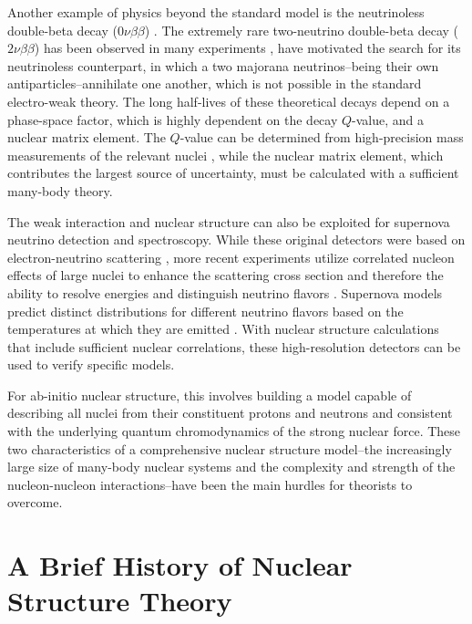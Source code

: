 \documentclass[../thesis.tex]{subfiles}
\begin{document}
Another example of physics beyond the standard model is the neutrinoless double-beta decay ($0\nu\beta\beta$) \cite{SUHONEN1998123,AVIGNONE2008481}. The extremely rare two-neutrino double-beta decay ($2\nu\beta\beta$) has been observed in many experiments \cite{ELLIOTT19872020,MILEY19903092}, have motivated the search for its neutrinoless counterpart, in which a two majorana neutrinos--being their own antiparticles--annihilate one another, which is not possible in the standard electro-weak theory. The long half-lives of these theoretical decays depend on a phase-space factor, which is highly dependent on the decay $Q$-value, and a nuclear matrix element. The $Q$-value can be determined from high-precision mass measurements of the relevant nuclei \cite{LINCOLN2013012501,GULYUZ2015055501,REDSHAW2012041306,BUSTABAD2013022501}, while the nuclear matrix element, which contributes the largest source of uncertainty, must be calculated with a sufficient many-body theory. 

The weak interaction and nuclear structure can also be exploited for supernova neutrino detection and spectroscopy. While these original detectors were based on electron-neutrino scattering \cite{HIRATA19871490,BIONTA19871494}, more recent experiments utilize correlated nucleon effects of large nuclei to enhance the scattering cross section and therefore the ability to resolve energies and distinguish neutrino flavors \cite{HARGROVE1996183,CLINE1994720,EWAN1992373,LANGANKE19962629}. Supernova models predict distinct distributions for different neutrino flavors based on the temperatures at which they are emitted \cite{KOLBE20032569,BENHAR2005053005}. With nuclear structure calculations that include sufficient nuclear correlations, these high-resolution detectors can be used to verify specific models.

For ab-initio nuclear structure, this involves building a model capable of describing all nuclei from their constituent protons and neutrons and consistent with the underlying quantum chromodynamics of the strong nuclear force. These two characteristics of a comprehensive nuclear structure model--the increasingly large size of many-body nuclear systems and the complexity and strength of the nucleon-nucleon interactions--have been the main hurdles for theorists to overcome. 



\section{A Brief History of Nuclear Structure Theory}
\end{document}
